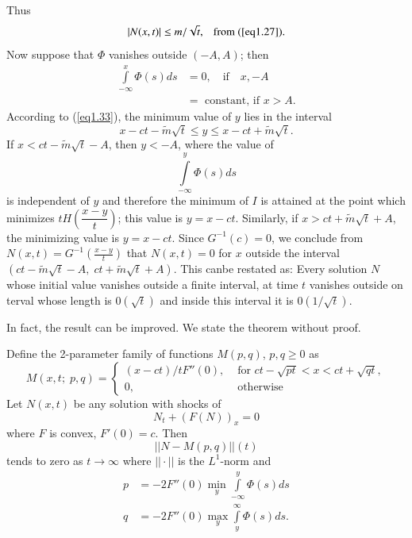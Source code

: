 Thus
$$
|N(x,t)| \leq m/ \sqrt{t}, \text{ \; from (\ref{eq1.27})}.
$$
Now suppose that $\Phi$ vanishes outside $(-A, A)$; then
\begin{align*}
\int\limits^x_{-\infty} \Phi (s) ds  & = 0, \quad \text{if} \quad x , - A\\
& = \text{ constant, if } x> A.
\end{align*}
According to (\ref{eq1.33}), the minimum value of $y$ lies in the interval
$$
x - ct - \tilde{m} \sqrt{t} \leq y \leq x - ct + \tilde{m} \sqrt{t}. 
$$
If $x < ct - \tilde{m} \sqrt{t} - A$, then $y < - A$, where the value of 
$$
\int\limits^y_{-\infty} \Phi (s) ds  
$$
is independent of $y$ and therefore the minimum of $I$ is attained at the point which minimizes $tH(\dfrac{x-y}{t})$; this value is $y = x - ct$. Similarly, if $x > ct + \tilde{m} \sqrt{t} + A$, the minimizing value is $y = x  - ct$. Since $G^{-1} (c) = 0$, we conclude from $N(x,t) = G^{-1} (\frac{x-y}{t})$ that $N(x,t) =0$ for  $x$ outside the interval $(ct - \tilde{m} \sqrt{t} - A , \; ct + \tilde{m} \sqrt{t} + A)$.
This can\pageoriginale be restated as: Every solution $N$ whose initial value vanishes outside a finite interval, at time $t$ vanishes outside on terval whose length is $0 (\sqrt{t})$ and inside this interval it is $0(1/\sqrt{t})$.

In fact, the result can be improved. We state the theorem without proof.

\begin{theorem*}
Define the 2-parameter family of functions $M(p,q)$, $p,q \geq 0$ as
$$
M(x,t; \; p, q) = 
\begin{cases}
(x-ct) / t F''(0) , & \text{ for } ct - \sqrt{pt} < x< ct + \sqrt{qt},\\
0, & \text{ otherwise}
\end{cases}
$$
Let $N(x,t)$ be any solution with shocks of 
$$
N_t + (F(N))_x = 0
$$
where $F$ is convex, $F'(0) = c$. Then
$$
||N - M (p,q)||(t)
$$
tends to zero as $t \to \infty$ where $||\cdot||$ is the $L^1$-norm and 
\begin{align*}
p & = -2 F''(0) \min\limits_y \int\limits^{y}_{-\infty} \Phi (s) ds\\
q & = -2 F''(0) \max\limits_y \int\limits^{\infty}_y \Phi (s) ds.
\end{align*}
\end{theorem*}

